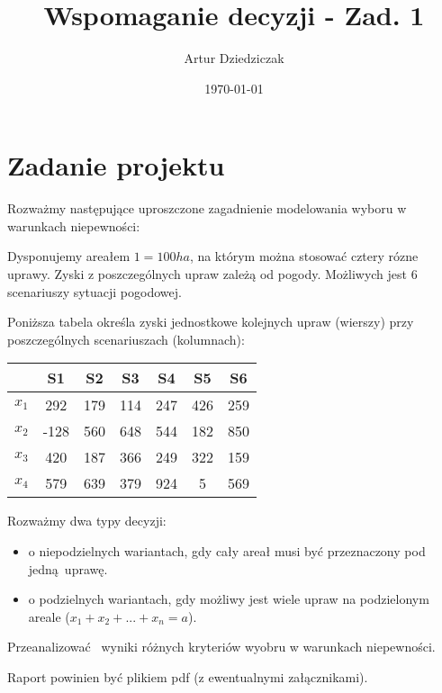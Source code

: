\documentclass{article}
\title{Wspomaganie decyzji - Zad. 1}
\author{Artur Dziedziczak}
\date{\today}
\begin{document}
\maketitle

\section{Zadanie projektu}

Rozważmy następujące uproszczone zagadnienie modelowania wyboru w warunkach niepewności:

Dysponujemy areałem $1 = 100ha$, na którym można stosować cztery rózne uprawy. Zyski z poszczególnych upraw zależą od pogody. Możliwych jest 6 scenariuszy sytuacji pogodowej.

Poniższa tabela określa zyski jednostkowe kolejnych upraw (wierszy) przy poszczególnych scenariuszach (kolumnach):

\begin{table}[H]
  \begin{center}
    \begin{tabular}{ c |  c  c   c   c   c   c  }
      & S1 & S2 & S3 & S4 & S5 & S6 \\
      \hline
      $x_1$ & 292 & 179 & 114 & 247 & 426 & 259 \\
      $x_2$ & -128 & 560 & 648 & 544 & 182 & 850 \\
      $x_3$ & 420 & 187 & 366 & 249 & 322 & 159 \\
      $x_4$ & 579 & 639 & 379 & 924 & 5 & 569 \\
      \hline
    \end{tabular} 
  \end{center}
\end{table}

Rozważmy dwa typy decyzji:

\begin{itemize}
    \item o niepodzielnych wariantach, gdy cały areał musi być przeznaczony pod jedną uprawę.
    \item o podzielnych wariantach, gdy możliwy jest wiele upraw na podzielonym areale ($x_1 + x_2 + ... + x_n = a$).
\end{itemize}

Przeanalizować  wyniki różnych kryteriów wyobru w warunkach niepewności.

Raport powinien być plikiem pdf (z ewentualnymi załącznikami).

\newpage
\end{document}
